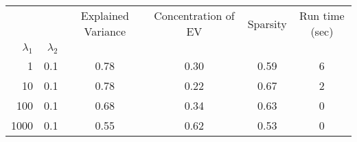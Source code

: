 \begin{tabular}{rr|cccc}
\toprule
     &     &  Explained Variance &  Concentration of EV &  Sparsity & Run time (sec) \\
$\lambda_1$ & $\lambda_2$ &                     &                      &           &                \\
\midrule
1    & 0.1 &                0.78 &                 0.30 &      0.59 &              6 \\
10   & 0.1 &                0.78 &                 0.22 &      0.67 &              2 \\
100  & 0.1 &                0.68 &                 0.34 &      0.63 &              0 \\
1000 & 0.1 &                0.55 &                 0.62 &      0.53 &              0 \\
\bottomrule
\end{tabular}
